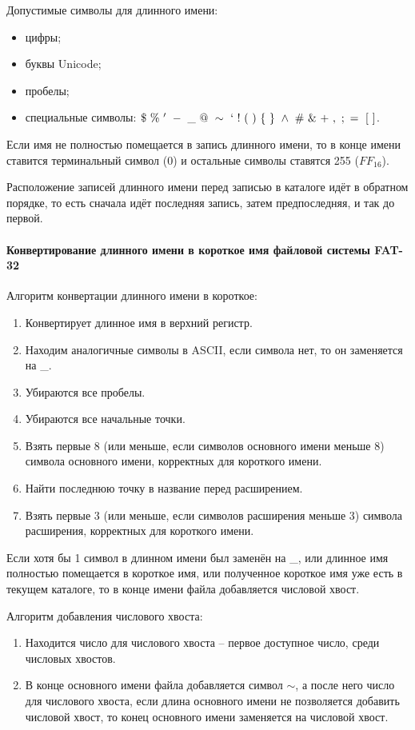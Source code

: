 Допустимые символы для длинного имени:

\begin{itemize}
\item цифры;
\item буквы Unicode;
\item пробелы;
\item специальные символы: $\$~\%~'~-~\_~@~\sim~`~!~(~)~\{~\}~\wedge~\#~\&~+~,~;~=~[~]$.
\end{itemize}

Если имя не полностью помещается в запись длинного имени, то в конце имени ставится терминальный символ (0) и остальные символы ставятся 255 ($FF_{16}$).

Расположение записей длинного имени перед записью в каталоге идёт в обратном порядке, то есть сначала идёт последняя запись, затем предпоследняя, и так до первой.

\paragraph{Конвертирование длинного имени в короткое имя файловой системы FAT-32}

Алгоритм конвертации длинного имени в короткое:

\begin{enumerate}
\item Конвертирует длинное имя в верхний регистр.
\item Находим аналогичные символы в ASCII, если символа нет, то он заменяется на \_.
\item Убираются все пробелы.
\item Убираются все начальные точки.
\item Взять первые 8 (или меньше, если символов основного имени меньше 8) символа основного имени, корректных для короткого имени.
\item Найти последнюю точку в название перед расширением.
\item Взять первые 3 (или меньше, если символов расширения меньше 3) символа расширения, корректных для короткого имени.
\end{enumerate}

Если хотя бы 1 символ в длинном имени был заменён на \_, или длинное имя полностью помещается в короткое имя, или полученное короткое имя уже есть в текущем каталоге, то в конце имени файла добавляется числовой хвост.

Алгоритм добавления числового хвоста:

\begin{enumerate}
\item Находится число для числового хвоста -- первое доступное число, среди числовых хвостов.
\item В конце основного имени файла добавляется символ $\sim$, а после него число для числового хвоста, если длина основного имени не позволяется добавить числовой хвост, то конец основного имени заменяется на числовой хвост.
\end{enumerate}

